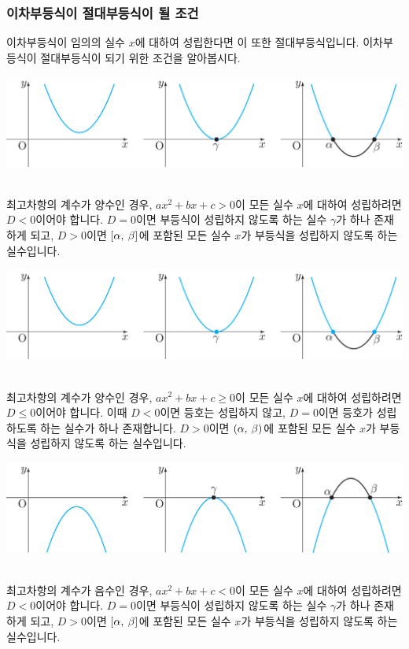 \subsubsection{이차부등식이 절대부등식이 될 조건}
이차부등식이 임의의 실수 $x$에 대하여 성립한다면 이 또한 절대부등식입니다. 이차부등식이 절대부등식이 되기 위한 조건을 알아봅시다.
\begin{center} \includegraphics[scale=\pgfkeysvalueof{picsize}]{DBs/pic/zery_28.pdf}\
	\end{center}최고차항의 계수가 양수인 경우, $ax^2 + bx + c > 0$이 모든 실수 $x$에 대하여 성립하려면 $D<0$이어야 합니다. $D=0$이면 부등식이 성립하지 않도록 하는 실수 $\gamma$가 하나 존재하게 되고, $D>0$이면 $\left[\alpha,\: \beta\right]$에 포함된 모든 실수 $x$가 부등식을 성립하지 않도록 하는 실수입니다.
\begin{center} \includegraphics[scale=\pgfkeysvalueof{picsize}]{DBs/pic/zery_29.pdf}\
	\end{center}최고차항의 계수가 양수인 경우, $ax^2 + bx + c \ge 0$이 모든 실수 $x$에 대하여 성립하려면 $D \le 0$이어야 합니다. 이때 $D<0$이면 등호는 성립하지 않고, $D=0$이면 등호가 성립하도록 하는 실수가 하나 존재합니다. $D>0$이면 $\left(\alpha,\: \beta\right)$에 포함된 모든 실수 $x$가 부등식을 성립하지 않도록 하는 실수입니다.
\clearpage\begin{center} \includegraphics[scale=\pgfkeysvalueof{picsize}]{DBs/pic/zery_30.pdf}\
	\end{center}최고차항의 계수가 음수인 경우, $ax^2 + bx + c < 0$이 모든 실수 $x$에 대하여 성립하려면 $D<0$이어야 합니다. $D=0$이면 부등식이 성립하지 않도록 하는 실수 $\gamma$가 하나 존재하게 되고, $D>0$이면  $\left[\alpha,\: \beta\right]$에 포함된 모든 실수 $x$가 부등식을 성립하지 않도록 하는 실수입니다.
